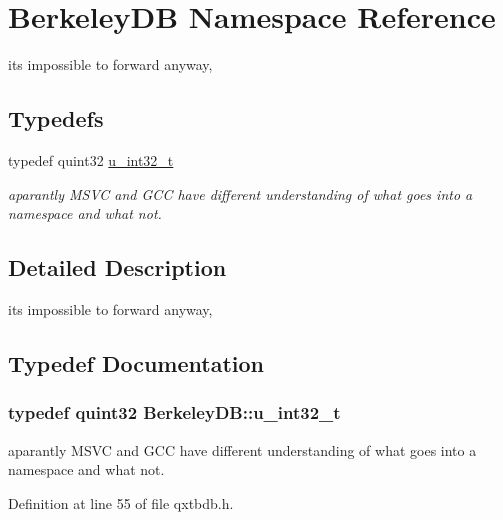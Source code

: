 \hypertarget{namespace_berkeley_d_b}{\section{Berkeley\-D\-B Namespace Reference}
\label{namespace_berkeley_d_b}
}


its impossible to forward anyway,  


\subsection*{Typedefs}
\begin{DoxyCompactItemize}
\item 
typedef quint32 \hyperlink{namespace_berkeley_d_b_af18e51055727bcdaec71de4ebaae0d67}{u\-\_\-int32\-\_\-t}
\begin{DoxyCompactList}\small\item\em aparantly M\-S\-V\-C and G\-C\-C have different understanding of what goes into a namespace and what not. \end{DoxyCompactList}\end{DoxyCompactItemize}


\subsection{Detailed Description}
its impossible to forward anyway, 

\subsection{Typedef Documentation}
\hypertarget{namespace_berkeley_d_b_af18e51055727bcdaec71de4ebaae0d67}{
\subsubsection[{u\-\_\-int32\-\_\-t}]{\setlength{\rightskip}{0pt plus 5cm}typedef quint32 {\bf Berkeley\-D\-B\-::u\-\_\-int32\-\_\-t}}}\label{namespace_berkeley_d_b_af18e51055727bcdaec71de4ebaae0d67}


aparantly M\-S\-V\-C and G\-C\-C have different understanding of what goes into a namespace and what not. 



Definition at line 55 of file qxtbdb.\-h.

